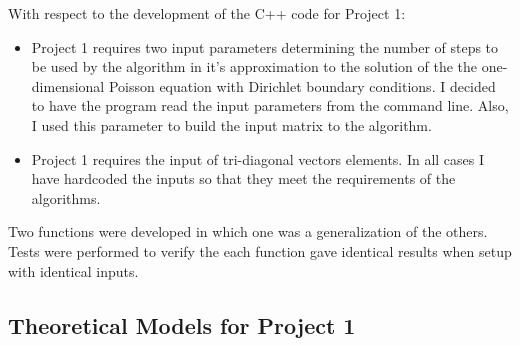 \documentclass[11pt, oneside]{article}   	%
\begin{document}
With respect to the development of the C++ code for Project 1:
\begin{itemize}
\item Project 1 requires two input parameters determining the number of steps to be used by the algorithm in it's approximation  to the solution of the the one-dimensional Poisson equation with Dirichlet boundary conditions. I decided to have the program read the input parameters from the command line. Also, I used this parameter to build the input matrix to the algorithm.
\item Project 1 requires the input of tri-diagonal vectors elements. In all cases I have hardcoded the inputs so that they meet the requirements of the algorithms.
\end{itemize} Two functions were developed in which  one was a generalization of the others. Tests were performed to verify the each function gave identical results when setup with identical inputs.
\subsection{Theoretical Models for Project 1}
\end{document}
